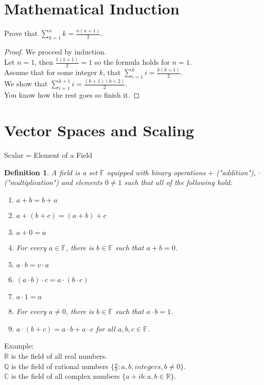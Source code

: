 \documentclass{report}
\newtheorem*{defn}{Definition}
\begin{document}
\section{Mathematical Induction}
Prove that $\sum_{k=1}^{n}k = \frac{n(n+1)}{2}$.
\begin{proof}
We proceed by induction.\\
Let $n=1$, then $\frac{1(1+1)}{2} = 1$ so the formula holds for $n=1$.\\
Assume that for some integer $k$, that $\sum_{i=1}^{k}i = \frac{k(k+1)}{2}$.\\
We show that $\sum_{i=1}^{k+1}i = \frac{(k+1)(k+2)}{2}$.\\
You know how the rest goes so finish it.
\end{proof}

\section{Vector Spaces and Scaling}
Scalar = Element of a Field\\
\begin{defn} A field is a set $\mathbb{F}$ equipped with binary operations $+$ ("addition"), $\cdot$ ("multiplication") and elements $0 \neq 1$ such that all of the following hold:
\begin{enumerate}
	\item[(i)] $a+b=b+a$
	\item[(ii)] $a+(b+c)=(a+b)+c$
	\item[(iii)] $a+0=a$
	\item[(iv)] For every $a \in \mathbb{F}$, there is $b \in \mathbb{F}$ such that $a+b=0$.
	\item[(v)] $a \cdot b = v \cdot a$
	\item[(vi)] $(a \cdot b) \cdot c = a \cdot (b \cdot c)$
	\item[(vii)] $a \cdot 1 = a$
	\item[(viii)] For every $a \neq 0$, there is $b \in \mathbb{F}$ such that $a \cdot b = 1$.
	\item[(ix)] $a \cdot (b + c) = a \cdot b + a \cdot c$ for all $a, b, c \in \mathbb{F}$.
\end{enumerate}
\end{defn}
Example:\\
$\mathbb{R}$ is the field of all real numbers.\\
$\mathbb{Q}$ is the field of rational numbers $\{\frac{a}{b}: a,b,integers,b \neq 0\}$.\\
$\mathbb{C}$ is the field of all complex numbers $\{a+ib: a,b\in \mathbb{R}\}$.
\end{document}
